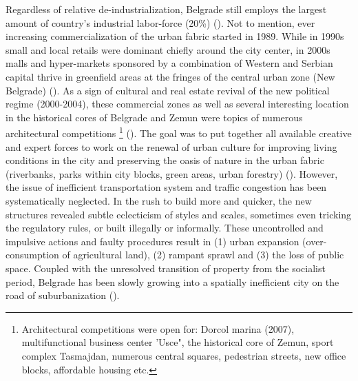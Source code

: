 \documentclass[11pt]{report}
\begin{document}
Regardless of relative de-industrialization, Belgrade  still  employs the largest amount of country’s industrial labor-force (20\%) (\href{ref}{\citealt{hirt_belgrade_2009}}).
Not to mention, ever increasing commercialization of the urban fabric started in 1989.
While in 1990s small and local retails were dominant chiefly around the city center, in 2000s  malls and hyper-markets sponsored by a combination of Western and Serbian capital thrive in greenfield areas at the fringes of the central urban zone (New Belgrade) (\cite{ibid.}).
As a sign of cultural and real estate revival of the new political regime (2000-2004), these commercial zones as well as several interesting location in the historical cores of Belgrade and Zemun were topics of numerous  architectural  competitions
\footnote{Architectural competitions were open for: Dorcol marina (2007), multifunctional business center 'Usce", the historical core of Zemun, sport complex Tasmajdan, numerous central squares, pedestrian streets, new office blocks, affordable housing etc.} %
(\href{ref}{\citealt{stupar_aleksandra_recreating_2004}}).
The goal was to put together all available creative and expert forces to work on the renewal of urban culture for improving living conditions in the city and preserving the oasis of nature in the urban fabric (riverbanks, parks within city blocks, green areas, urban forestry) (\href{ref}{\citealt{grozdanic_belgrade_2008}}).
However, the issue of inefficient transportation system and traffic congestion has been systematically neglected.
In the rush to build more and quicker, the new structures revealed subtle eclecticism of styles and scales, sometimes even tricking the regulatory rules, or built illegally or informally.
These uncontrolled and impulsive actions and faulty procedures result in (1) urban expansion (over-consumption of agricultural land), (2) rampant sprawl and (3) the loss of public space. Coupled with the unresolved transition of property from the socialist period, Belgrade has been slowly growing into a spatially inefficient city on the road of suburbanization (\href{ref}{\citealt{zekovic_spatial_2015}}).
\\
\end{document}
